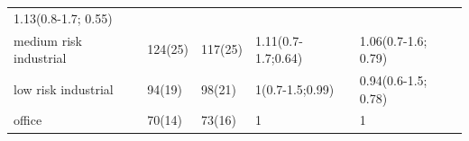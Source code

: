 \documentclass[
]{article}
\begin{document}
\begin{longtable}[]{@{}lllll@{}}
\begin{minipage}[t]{0.23\columnwidth}
1.13(0.8-1.7; 0.55)\strut
\end{minipage}\tabularnewline
\begin{minipage}[t]{0.20\columnwidth}\raggedright
medium risk industrial\strut
\end{minipage} & \begin{minipage}[t]{0.08\columnwidth}\raggedright
124(25)\strut
\end{minipage} & \begin{minipage}[t]{0.10\columnwidth}\raggedright
117(25)\strut
\end{minipage} & \begin{minipage}[t]{0.24\columnwidth}\raggedright
1.11(0.7-1.7;0.64)\strut
\end{minipage} & \begin{minipage}[t]{0.23\columnwidth}\raggedright
1.06(0.7-1.6; 0.79)\strut
\end{minipage}\tabularnewline
\begin{minipage}[t]{0.20\columnwidth}\raggedright
low risk industrial\strut
\end{minipage} & \begin{minipage}[t]{0.08\columnwidth}\raggedright
94(19)\strut
\end{minipage} & \begin{minipage}[t]{0.10\columnwidth}\raggedright
98(21)\strut
\end{minipage} & \begin{minipage}[t]{0.24\columnwidth}\raggedright
1(0.7-1.5;0.99)\strut
\end{minipage} & \begin{minipage}[t]{0.23\columnwidth}\raggedright
0.94(0.6-1.5; 0.78)\strut
\end{minipage}\tabularnewline
\begin{minipage}[t]{0.20\columnwidth}\raggedright
office\strut
\end{minipage} & \begin{minipage}[t]{0.08\columnwidth}\raggedright
70(14)\strut
\end{minipage} & \begin{minipage}[t]{0.10\columnwidth}\raggedright
73(16)\strut
\end{minipage} & \begin{minipage}[t]{0.24\columnwidth}\raggedright
1\strut
\end{minipage} & \begin{minipage}[t]{0.23\columnwidth}\raggedright
1\strut
\end{minipage}\tabularnewline
\bottomrule
\end{longtable}
\end{document}
